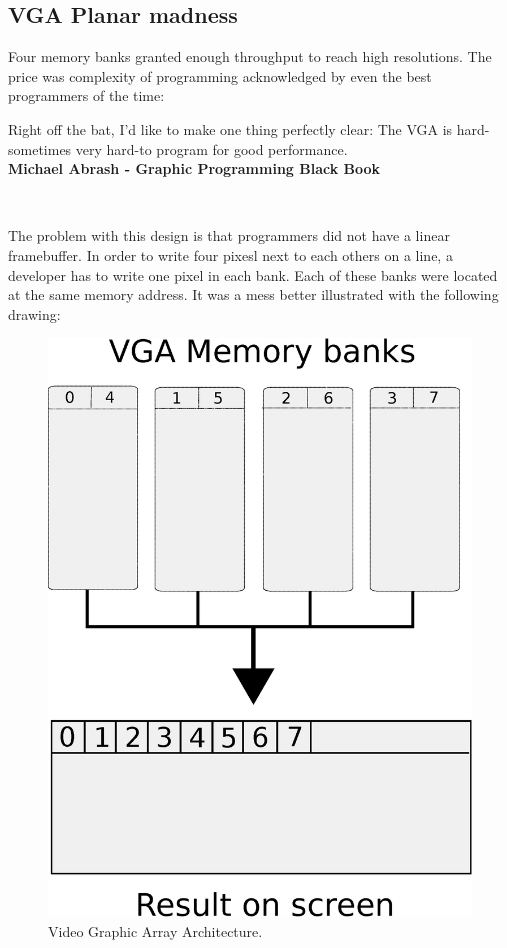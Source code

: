 \documentclass[book.tex]{subfiles}
\begin{document}
\subsection{VGA Planar madness}

Four memory banks granted enough throughput to reach high resolutions. The price was complexity of programming acknowledged by even the best programmers of the time:\\

 \begin{fancyquotes}
   Right off the bat, I'd like to make one thing perfectly clear: The VGA is hard-sometimes very hard-to program for good performance.
 \bigskip \\
\textbf{Michael Abrash - Graphic Programming Black Book}
 \end{fancyquotes}
 \\
\par
The problem with this design is that programmers did not have a linear framebuffer. In order to write four pixesl next to each others on a line, a developer has to write one pixel in each bank. Each of these banks were located at the same memory address. It was a mess better illustrated with the following drawing:\\
\par
\begin{figure}[H]
\centering
\includegraphics[width=\textwidth]{imgs/drawings/vga_ram_screen_layout.eps}
\caption{Video Graphic Array Architecture.}
\label{fig:vga_arch}
\end{figure}
\end{document}
